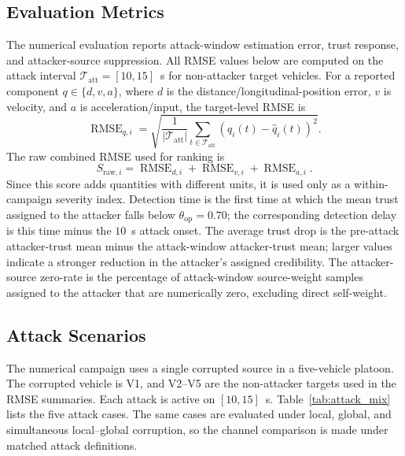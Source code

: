 \documentclass[letterpaper,journal]{IEEEtran}
\begin{document}
\subsection{Evaluation Metrics}
The numerical evaluation reports attack-window estimation error, trust response, and attacker-source suppression. All RMSE values below are computed on the attack interval $\mathcal{T}_{\mathrm{att}}=[10,15]$~s for non-attacker target vehicles. For a reported component $q\in\{d,v,a\}$, where $d$ is the distance/longitudinal-position error, $v$ is velocity, and $a$ is acceleration/input, the target-level RMSE is
\begin{equation}
\operatorname{RMSE}_{q,i}=
\sqrt{\frac{1}{|\mathcal{T}_{\mathrm{att}}|}\sum_{t\in\mathcal{T}_{\mathrm{att}}}
\left(q_i(t)-\hat q_i(t)\right)^2}.
\end{equation}
The raw combined RMSE used for ranking is
\begin{equation}
S_{\mathrm{raw},i}
=\operatorname{RMSE}_{d,i}+\operatorname{RMSE}_{v,i}
+\operatorname{RMSE}_{a,i}.
\end{equation}
Since this score adds quantities with different units, it is used only as a within-campaign severity index. Detection time is the first time at which the mean trust assigned to the attacker falls below $\theta_{\mathrm{op}}=0.70$; the corresponding detection delay is this time minus the $10$~s attack onset. The average trust drop is the pre-attack attacker-trust mean minus the attack-window attacker-trust mean; larger values indicate a stronger reduction in the attacker's assigned credibility. The attacker-source zero-rate is the percentage of attack-window source-weight samples assigned to the attacker that are numerically zero, excluding direct self-weight.

\subsection{Attack Scenarios}\label{sec:attack_scenarios}
The numerical campaign uses a single corrupted source in a five-vehicle platoon. The corrupted vehicle is V1, and V2--V5 are the non-attacker targets used in the RMSE summaries. Each attack is active on $[10,15]$~s. Table~\ref{tab:attack_mix} lists the five attack cases. The same cases are evaluated under local, global, and simultaneous local--global corruption, so the channel comparison is made under matched attack definitions.
\end{document}

